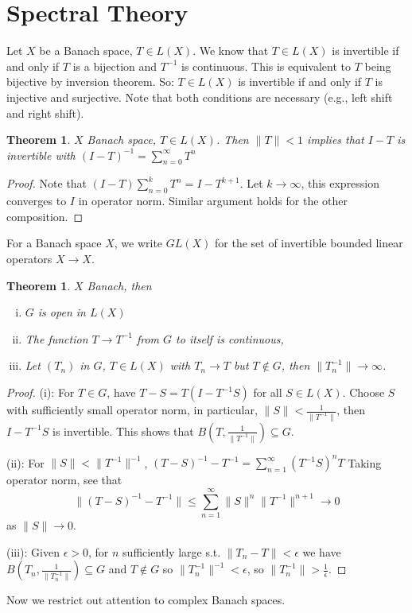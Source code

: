 \documentclass{article}
\theoremstyle{definition}
\theoremstyle{remark}
\theoremstyle{plain}
\newtheorem{thm}[defn]{Theorem}
\begin{document}
\section{Spectral Theory}
Let $X$ be a Banach space, $T\in L(X)$. We know that $T\in L(X)$ is invertible if and only if $T$ is a bijection and $T^{-1}$ is continuous. This is equivalent to $T$ being bijective by inversion theorem. So: $T\in L(X)$ is invertible if and only if $T$ is injective and surjective. Note that both conditions are necessary (e.g., left shift and right shift).
\begin{thm}
    $X$ Banach space, $T\in L(X)$. Then $\|T\|<1$ implies that $I-T$ is invertible with $(I-T)^{-1}=\sum_{n=0}^\infty T^n$
\end{thm}
\begin{proof}
    Note that $(I-T)\sum_{n=0}^k T^n=I-T^{k+1}$. Let $k\to \infty$, this expression converges to $I$ in operator norm. Similar argument holds for the other composition.
\end{proof}
For a Banach space $X$, we write $GL(X)$ for the set of invertible bounded linear operators $X\to X$.
\begin{thm}
    $X$ Banach, then
    \begin{enumerate}[(i)]
        \item $G$ is open in $L(X)$
        \item The function $T\to T^{-1}$ from $G$ to itself is continuous,
        \item Let $(T_n)$ in $G$, $T\in L(X)$ with $T_n\to T$ but $T\notin G$, then $\|T_n^{-1}\|\to \infty$.
    \end{enumerate}
\end{thm}
\begin{proof}
    (i): For $T\in G$, have $T-S=T(I-T^{-1}S)$ for all $S\in L(X)$. Choose $S$ with sufficiently small operator norm, in particular, $\|S\|<\frac{1}{\|T^{-1}\|}$, then $I-T^{-1}S$ is invertible. This shows that $B(T,\frac{1}{\|T^{-1}\|})\subseteq G$.

    (ii): For $\|S\|<\|T^{-1}\|^{-1}$, $(T-S)^{-1}-T^{-1}=\sum_{n=1}^\infty (T^{-1}S)^nT$ Taking operator norm, see that
    \[\|(T-S)^{-1}-T^{-1}\|\le\sum_{n=1}^\infty\|S\|^n\|T^{-1}\|^{n+1}\to 0\] as $\|S\|\to0$.

    (iii): Given $\epsilon>0$, for $n$ sufficiently large s.t. $\|T_n-T\|<\epsilon$ we have $B(T_n,\frac{1}{\|T_n^{-1}\|})\subseteq G$ and $T\notin G$ so $\|T_n^{-1}\|^{-1}<\epsilon$, so $\|T_n^{-1}\|>\frac1\epsilon$.
\end{proof}
Now we restrict out attention to complex Banach spaces.
\end{document}
